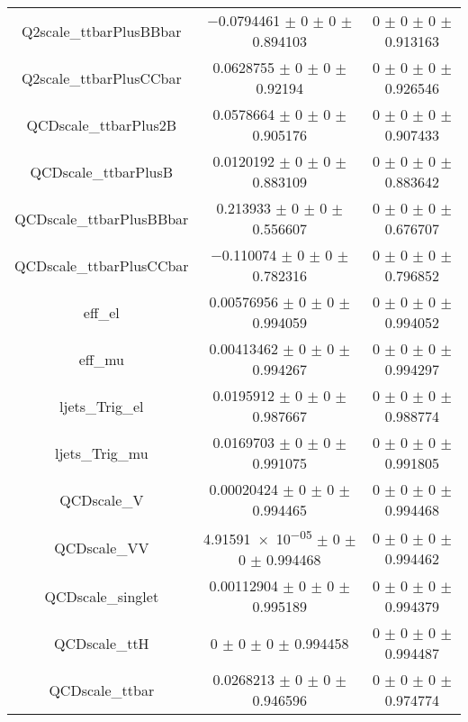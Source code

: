 \begin{table}
\begin{tabular}{ccc}
Q2scale\_ttbarPlusBBbar & \num{-0.0794461} $\pm$ \num{0} $\pm$ \num{0} $\pm$ \num{0.894103} & \num{0} $\pm$ \num{0} $\pm$ \num{0} $\pm$ \num{0.913163}\\
Q2scale\_ttbarPlusCCbar & \num{0.0628755} $\pm$ \num{0} $\pm$ \num{0} $\pm$ \num{0.92194} & \num{0} $\pm$ \num{0} $\pm$ \num{0} $\pm$ \num{0.926546}\\
QCDscale\_ttbarPlus2B & \num{0.0578664} $\pm$ \num{0} $\pm$ \num{0} $\pm$ \num{0.905176} & \num{0} $\pm$ \num{0} $\pm$ \num{0} $\pm$ \num{0.907433}\\
QCDscale\_ttbarPlusB & \num{0.0120192} $\pm$ \num{0} $\pm$ \num{0} $\pm$ \num{0.883109} & \num{0} $\pm$ \num{0} $\pm$ \num{0} $\pm$ \num{0.883642}\\
QCDscale\_ttbarPlusBBbar & \num{0.213933} $\pm$ \num{0} $\pm$ \num{0} $\pm$ \num{0.556607} & \num{0} $\pm$ \num{0} $\pm$ \num{0} $\pm$ \num{0.676707}\\
QCDscale\_ttbarPlusCCbar & \num{-0.110074} $\pm$ \num{0} $\pm$ \num{0} $\pm$ \num{0.782316} & \num{0} $\pm$ \num{0} $\pm$ \num{0} $\pm$ \num{0.796852}\\
eff\_el & \num{0.00576956} $\pm$ \num{0} $\pm$ \num{0} $\pm$ \num{0.994059} & \num{0} $\pm$ \num{0} $\pm$ \num{0} $\pm$ \num{0.994052}\\
eff\_mu & \num{0.00413462} $\pm$ \num{0} $\pm$ \num{0} $\pm$ \num{0.994267} & \num{0} $\pm$ \num{0} $\pm$ \num{0} $\pm$ \num{0.994297}\\
ljets\_Trig\_el & \num{0.0195912} $\pm$ \num{0} $\pm$ \num{0} $\pm$ \num{0.987667} & \num{0} $\pm$ \num{0} $\pm$ \num{0} $\pm$ \num{0.988774}\\
ljets\_Trig\_mu & \num{0.0169703} $\pm$ \num{0} $\pm$ \num{0} $\pm$ \num{0.991075} & \num{0} $\pm$ \num{0} $\pm$ \num{0} $\pm$ \num{0.991805}\\
QCDscale\_V & \num{0.00020424} $\pm$ \num{0} $\pm$ \num{0} $\pm$ \num{0.994465} & \num{0} $\pm$ \num{0} $\pm$ \num{0} $\pm$ \num{0.994468}\\
QCDscale\_VV & \num{4.91591e-05} $\pm$ \num{0} $\pm$ \num{0} $\pm$ \num{0.994468} & \num{0} $\pm$ \num{0} $\pm$ \num{0} $\pm$ \num{0.994462}\\
QCDscale\_singlet & \num{0.00112904} $\pm$ \num{0} $\pm$ \num{0} $\pm$ \num{0.995189} & \num{0} $\pm$ \num{0} $\pm$ \num{0} $\pm$ \num{0.994379}\\
QCDscale\_ttH & \num{0} $\pm$ \num{0} $\pm$ \num{0} $\pm$ \num{0.994458} & \num{0} $\pm$ \num{0} $\pm$ \num{0} $\pm$ \num{0.994487}\\
QCDscale\_ttbar & \num{0.0268213} $\pm$ \num{0} $\pm$ \num{0} $\pm$ \num{0.946596} & \num{0} $\pm$ \num{0} $\pm$ \num{0} $\pm$ \num{0.974774}\\

\end{tabular}
\end{table}
